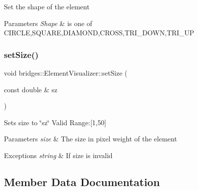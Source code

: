 Set the shape of the element


\begin{DoxyParams}{Parameters}
{\em Shape} & is one of C\+I\+R\+C\+LE,S\+Q\+U\+A\+RE,D\+I\+A\+M\+O\+ND,C\+R\+O\+SS,T\+R\+I\+\_\+\+D\+O\+WN,T\+R\+I\+\_\+\+UP \\
\hline
\end{DoxyParams}
\mbox{\label{classbridges_1_1_element_visualizer_a6fc924e754008992b310a89d8d88fce9}} 
\subsubsection{\texorpdfstring{set\+Size()}{setSize()}}
{\footnotesize\ttfamily void bridges\+::\+Element\+Visualizer\+::set\+Size (\begin{DoxyParamCaption}\item[{const double \&}]{sz }\end{DoxyParamCaption})\hspace{0.3cm}{\ttfamily [inline]}}

Sets size to \char`\"{}sz\char`\"{} Valid Range\+:\mbox{[}1,50\mbox{]}


\begin{DoxyParams}{Parameters}
{\em size} & The size in pixel weight of the element \\
\hline
\end{DoxyParams}

\begin{DoxyExceptions}{Exceptions}
{\em string} & If size is invalid \\
\hline
\end{DoxyExceptions}


\subsection{Member Data Documentation}
\mbox{\label{classbridges_1_1_element_visualizer_ade224640b18e3f6eed42098ea0ad5b3a}} 
